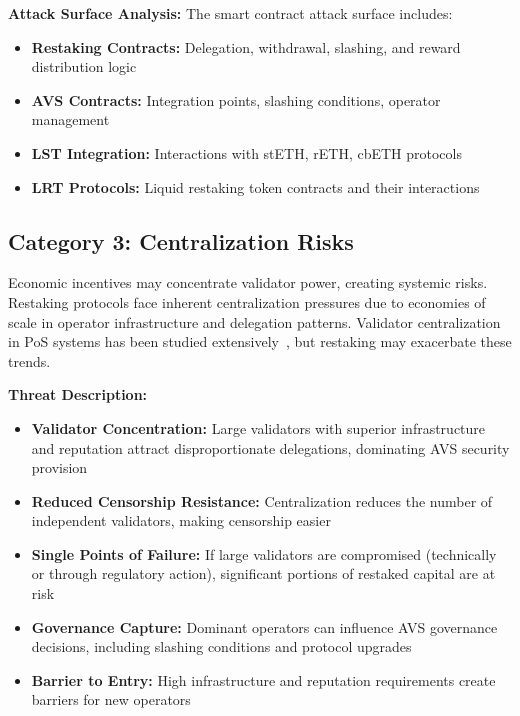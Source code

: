 \documentclass[runningheads]{llncs}
\begin{document}
\textbf{Attack Surface Analysis:}
The smart contract attack surface includes:
\begin{itemize}
    \item \textbf{Restaking Contracts:} Delegation, withdrawal, slashing, and reward distribution logic
    \item \textbf{AVS Contracts:} Integration points, slashing conditions, operator management
    \item \textbf{LST Integration:} Interactions with stETH, rETH, cbETH protocols
    \item \textbf{LRT Protocols:} Liquid restaking token contracts and their interactions
\end{itemize}

\subsection{Category 3: Centralization Risks}

Economic incentives may concentrate validator power, creating systemic risks. Restaking protocols face inherent centralization pressures due to economies of scale in operator infrastructure and delegation patterns. Validator centralization in PoS systems has been studied extensively~\cite{chen2022rollup}, but restaking may exacerbate these trends.

\textbf{Threat Description:}
\begin{itemize}
    \item \textbf{Validator Concentration:} Large validators with superior infrastructure and reputation attract disproportionate delegations, dominating AVS security provision
    \item \textbf{Reduced Censorship Resistance:} Centralization reduces the number of independent validators, making censorship easier
    \item \textbf{Single Points of Failure:} If large validators are compromised (technically or through regulatory action), significant portions of restaked capital are at risk
    \item \textbf{Governance Capture:} Dominant operators can influence AVS governance decisions, including slashing conditions and protocol upgrades
    \item \textbf{Barrier to Entry:} High infrastructure and reputation requirements create barriers for new operators
\end{itemize}
\end{document}
